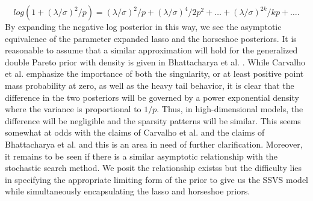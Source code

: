 \begin{equation}\label{eqn:taylor_log_one_plus_x}
log\left(1+(\lambda/\sigma)^2/p\right) = (\lambda/\sigma)^2/p + (\lambda/\sigma)^4/2p^2 + \dots+ (\lambda/\sigma)^{2k}/kp + \dots.
\end{equation}
By expanding the negative log posterior in this way, we see the asymptotic equivalence of the parameter expanded lasso and the horseshoe posteriors. It is reasonable to assume that a similar approximation will hold for the generalized double Pareto prior with density is given in Bhattacharya et al. \cite{bhattacharya2012bayesian}. While Carvalho et al. \cite{carvalho2010horseshoe} emphasize the importance of both the singularity, or at least positive point mass probability at zero, as well as the heavy tail behavior, it is clear that the difference in the two posteriors will be governed by a power exponential density where the variance is proportional to $1/p$. Thus, in high-dimensional models, the difference will be negligible and the sparsity patterns will be similar. This seems somewhat at odds with the claims of Carvalho et al. and the claims of Bhattacharya et al. and this is an area in need of further clarification. Moreover, it remains to be seen if there is a similar asymptotic relationship with the stochastic search method. We posit the relationship existss but the difficulty lies in specifying the appropriate limiting form of the prior to give us the SSVS model while simultaneously encapsulating the lasso and horseshoe priors. 



 